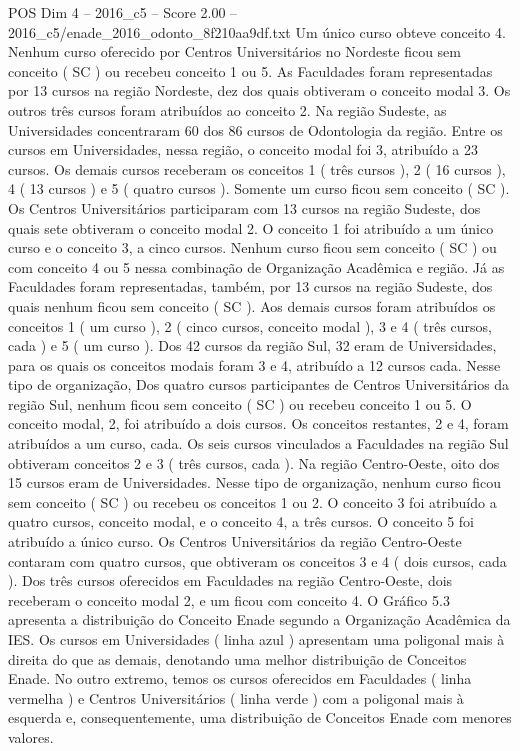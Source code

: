 \begin{textsample}{POS Dim 4 – 2016\_c5 – Score 2.00 – 2016\_c5/enade\_2016\_odonto\_8f210aa9df.txt}
Um único curso obteve conceito 4.
Nenhum curso oferecido por Centros Universitários no Nordeste ficou sem conceito ( SC ) ou recebeu conceito 1 ou 5.
As Faculdades foram representadas por 13 cursos na região Nordeste, dez dos quais obtiveram o conceito modal 3.
Os outros três cursos foram atribuídos ao conceito 2.
Na região Sudeste, as Universidades concentraram 60 dos 86 cursos de Odontologia da região.
Entre os cursos em Universidades, nessa região, o conceito modal foi 3, atribuído a 23 cursos.
Os demais cursos receberam os conceitos 1 ( três cursos ), 2 ( 16 cursos ), 4 ( 13 cursos ) e 5 ( quatro cursos ).
Somente um curso ficou sem conceito ( SC ).
Os Centros Universitários participaram com 13 cursos na região Sudeste, dos quais sete obtiveram o conceito modal 2.
O conceito 1 foi atribuído a um único curso e o conceito 3, a cinco cursos.
Nenhum curso ficou sem conceito ( SC ) ou com conceito 4 ou 5 nessa combinação de Organização Acadêmica e região.
Já as Faculdades foram representadas, também, por 13 cursos na região Sudeste, dos quais nenhum ficou sem conceito ( SC ).
Aos demais cursos foram atribuídos os conceitos 1 ( um curso ), 2 ( cinco cursos, conceito modal ), 3 e 4 ( três cursos, cada ) e 5 ( um curso ).
Dos 42 cursos da região Sul, 32 eram de Universidades, para os quais os conceitos modais foram 3 e 4, atribuído a 12 cursos cada.
Nesse tipo de organização, Dos quatro cursos participantes de Centros Universitários da região Sul, nenhum ficou sem conceito ( SC ) ou recebeu conceito 1 ou 5.
O conceito modal, 2, foi atribuído a dois cursos.
Os conceitos restantes, 2 e 4, foram atribuídos a um curso, cada.
Os seis cursos vinculados a Faculdades na região Sul obtiveram conceitos 2 e 3 ( três cursos, cada ).
Na região Centro-Oeste, oito dos 15 cursos eram de Universidades.
Nesse tipo de organização, nenhum curso ficou sem conceito ( SC ) ou recebeu os conceitos 1 ou 2.
O conceito 3 foi atribuído a quatro cursos, conceito modal, e o conceito 4, a três cursos.
O conceito 5 foi atribuído a único curso.
Os Centros Universitários da região Centro-Oeste contaram com quatro cursos, que obtiveram os conceitos 3 e 4 ( dois cursos, cada ).
Dos três cursos oferecidos em Faculdades na região Centro-Oeste, dois receberam o conceito modal 2, e um ficou com conceito 4.
O Gráfico 5.3 apresenta a distribuição do Conceito Enade segundo a Organização Acadêmica da IES.
Os cursos em Universidades ( linha azul ) apresentam uma poligonal mais à direita do que as demais, denotando uma melhor distribuição de Conceitos Enade.
No outro extremo, temos os cursos oferecidos em Faculdades ( linha vermelha ) e Centros Universitários ( linha verde ) com a poligonal mais à esquerda e, consequentemente, uma distribuição de Conceitos Enade com menores valores.

\end{textsample}
